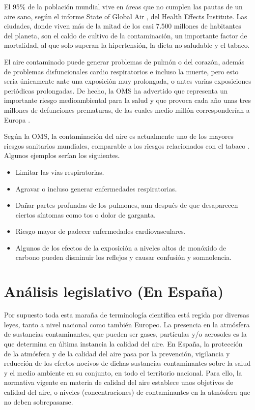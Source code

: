 El 95\% de la población mundial vive en áreas que no cumplen las pautas de un aire sano, según el informe State of Global Air \cite{state_global_air_2018}, del Health Effects Institute. Las ciudades, donde viven más de la mitad de los casi 7.500 millones de habitantes del planeta, son el caldo de cultivo de la contaminación, un importante factor de mortalidad, al que solo superan la hipertensión, la dieta no saludable y el tabaco.

El aire contaminado puede generar problemas de pulmón o del corazón, además de problemas disfuncionales cardio respiratorios e incluso la muerte, pero esto sería únicamente ante una exposición muy prolongada, o antes varias exposiciones periódicas prolongadas. De hecho, la OMS ha advertido que representa un importante riesgo medioambiental para la salud y que provoca cada año unas tres millones de defunciones prematuras, de las cuales medio millón corresponderían a Europa \cite{2018_oms_calidad}.

Según la OMS, la contaminación del aire es actualmente uno de los mayores riesgos sanitarios mundiales, comparable a los riesgos relacionados con el tabaco \cite{2018_oms_calidad}. Algunos ejemplos serían los siguientes.

\begin{itemize}
\item Limitar las vías respiratorias.

\item Agravar o incluso generar enfermedades respiratorias.

\item Dañar partes profundas de los pulmones, aun después de que desaparecen ciertos síntomas como tos o dolor de garganta.

\item Riesgo mayor de padecer enfermedades cardiovasculares.

\item Algunos de los efectos de la exposición a niveles altos de monóxido de carbono pueden disminuir los reflejos y causar confusión y somnolencia.	
	
\end{itemize}



\section{Análisis legislativo (En España)}\label{teorico-legislativo}

Por supuesto toda esta maraña de terminología científica está regida por diversas leyes, tanto a nivel nacional como también Europeo. La presencia en la atmósfera de sustancias contaminantes, que pueden ser gases, partículas y/o aerosoles es la que determina en última instancia la calidad del aire. En España, la protección de la atmósfera y de la calidad del aire pasa por la prevención, vigilancia y reducción de los efectos nocivos de dichas sustancias contaminantes sobre la salud y el medio ambiente en su conjunto, en todo el territorio nacional. Para ello, la normativa vigente en materia de calidad del aire establece unos objetivos de calidad del aire, o niveles (concentraciones) de contaminantes en la atmósfera que no deben sobrepasarse. 


